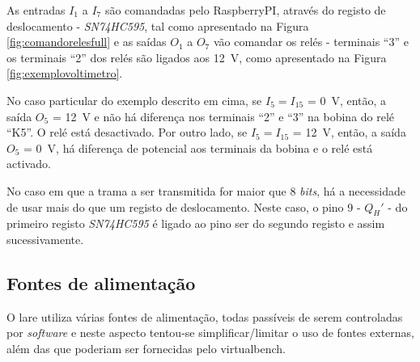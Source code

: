 As entradas $I_{1}$ a $I_{7}$ são comandadas pelo \gls{RaspberryPI}, através do registo de deslocamento - \textit{SN74HC595}, tal como apresentado na Figura \ref{fig:comandorelesfull} e as saídas $O_{1}$ a $O_{7}$ vão comandar os relés - terminais ``3'' e os terminais ``2'' dos relés são ligados aos \SI{12}{\volt}, como apresentado na Figura \ref{fig:exemplovoltimetro}.


No caso particular do exemplo descrito em cima, se $I_{5} = I_{15}$ = \SI{0}{\volt}, então, a saída $O_{5}$ = \SI{12}{\volt} e não há diferença nos terminais ``2'' e ``3'' na bobina do relé  ``K5''. O relé está desactivado. Por outro lado, se $I_{5} = I_{15}$ = \SI{12}{\volt}, então, a saída $O_{5}$ = \SI{0}{\volt}, há diferença de potencial aos terminais da bobina e o relé está activado.

No caso em que a trama a ser transmitida for maior que 8 \textit{bits}, há a necessidade de usar mais do que um registo de deslocamento. Neste caso, o pino 9 - $Q_{H}'$ - do primeiro registo \textit{SN74HC595} é ligado ao pino \acrshort{ser} do segundo registo e assim sucessivamente.

\subsection{Fontes de alimentação}
\label{sec:fontesalimentacao}

O \acrshort{lare} utiliza várias fontes de alimentação, todas passíveis de serem controladas por \textit{software} e neste aspecto tentou-se simplificar/limitar o uso de fontes externas, além das que poderiam ser fornecidas pelo \acrshort{virtualbench}. 


